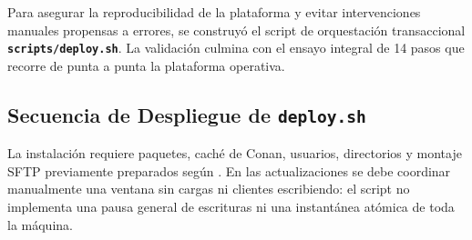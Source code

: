 \documentclass[10pt,a4paper]{article}
\begin{document}
Para asegurar la reproducibilidad de la plataforma y evitar intervenciones manuales propensas a errores, se construyó el script de orquestación transaccional \textbf{\texttt{scripts/deploy.sh}}. La validación culmina con el ensayo integral de 14 pasos que recorre de punta a punta la plataforma operativa.

\subsection{Secuencia de Despliegue de \texttt{deploy.sh}}

La instalación requiere paquetes, caché de Conan, usuarios, directorios y montaje SFTP previamente preparados según . En las actualizaciones se debe coordinar manualmente una ventana sin cargas ni clientes escribiendo: el script no implementa una pausa general de escrituras ni una instantánea atómica de toda la máquina.
\end{document}
